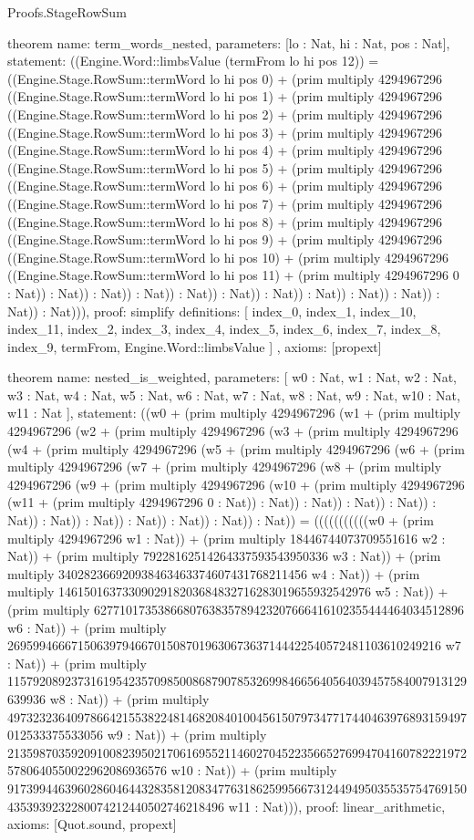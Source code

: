 \begin{lexlean}{Proofs.StageRowSum}
\begin{semanticmodule}
theorem{
  name: term_words_nested,
  parameters: [lo : Nat, hi : Nat, pos : Nat],
  statement: ((Engine.Word::limbsValue (termFrom lo hi pos 12)) = ((Engine.Stage.RowSum::termWord lo hi pos 0) + (prim multiply 4294967296 ((Engine.Stage.RowSum::termWord lo hi pos 1) + (prim multiply 4294967296 ((Engine.Stage.RowSum::termWord lo hi pos 2) + (prim multiply 4294967296 ((Engine.Stage.RowSum::termWord lo hi pos 3) + (prim multiply 4294967296 ((Engine.Stage.RowSum::termWord lo hi pos 4) + (prim multiply 4294967296 ((Engine.Stage.RowSum::termWord lo hi pos 5) + (prim multiply 4294967296 ((Engine.Stage.RowSum::termWord lo hi pos 6) + (prim multiply 4294967296 ((Engine.Stage.RowSum::termWord lo hi pos 7) + (prim multiply 4294967296 ((Engine.Stage.RowSum::termWord lo hi pos 8) + (prim multiply 4294967296 ((Engine.Stage.RowSum::termWord lo hi pos 9) + (prim multiply 4294967296 ((Engine.Stage.RowSum::termWord lo hi pos 10) + (prim multiply 4294967296 ((Engine.Stage.RowSum::termWord lo hi pos 11) + (prim multiply 4294967296 0 : Nat)) : Nat)) : Nat)) : Nat)) : Nat)) : Nat)) : Nat)) : Nat)) : Nat)) : Nat)) : Nat)) : Nat))),
  proof: simplify{
    definitions: [
      index_0,
      index_1,
      index_10,
      index_11,
      index_2,
      index_3,
      index_4,
      index_5,
      index_6,
      index_7,
      index_8,
      index_9,
      termFrom,
      Engine.Word::limbsValue
    ]
  },
  axioms: [propext]
}

theorem{
  name: nested_is_weighted,
  parameters: [
    w0 : Nat,
    w1 : Nat,
    w2 : Nat,
    w3 : Nat,
    w4 : Nat,
    w5 : Nat,
    w6 : Nat,
    w7 : Nat,
    w8 : Nat,
    w9 : Nat,
    w10 : Nat,
    w11 : Nat
  ],
  statement: ((w0 + (prim multiply 4294967296 (w1 + (prim multiply 4294967296 (w2 + (prim multiply 4294967296 (w3 + (prim multiply 4294967296 (w4 + (prim multiply 4294967296 (w5 + (prim multiply 4294967296 (w6 + (prim multiply 4294967296 (w7 + (prim multiply 4294967296 (w8 + (prim multiply 4294967296 (w9 + (prim multiply 4294967296 (w10 + (prim multiply 4294967296 (w11 + (prim multiply 4294967296 0 : Nat)) : Nat)) : Nat)) : Nat)) : Nat)) : Nat)) : Nat)) : Nat)) : Nat)) : Nat)) : Nat)) : Nat)) = (((((((((((w0 + (prim multiply 4294967296 w1 : Nat)) + (prim multiply 18446744073709551616 w2 : Nat)) + (prim multiply 79228162514264337593543950336 w3 : Nat)) + (prim multiply 340282366920938463463374607431768211456 w4 : Nat)) + (prim multiply 1461501637330902918203684832716283019655932542976 w5 : Nat)) + (prim multiply 6277101735386680763835789423207666416102355444464034512896 w6 : Nat)) + (prim multiply 26959946667150639794667015087019630673637144422540572481103610249216 w7 : Nat)) + (prim multiply 115792089237316195423570985008687907853269984665640564039457584007913129639936 w8 : Nat)) + (prim multiply 497323236409786642155382248146820840100456150797347717440463976893159497012533375533056 w9 : Nat)) + (prim multiply 2135987035920910082395021706169552114602704522356652769947041607822219725780640550022962086936576 w10 : Nat)) + (prim multiply 9173994463960286046443283581208347763186259956673124494950355357547691504353939232280074212440502746218496 w11 : Nat))),
  proof: linear_arithmetic{},
  axioms: [Quot.sound, propext]
}


\end{semanticmodule}
\end{lexlean}
